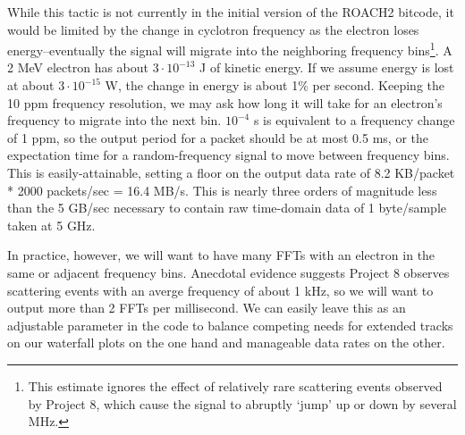 \documentclass[a4paper,10pt]{article}
\begin{document}
While this tactic is not currently in the initial version of the ROACH2 bitcode, it would be limited by the change in cyclotron frequency as the electron loses energy--eventually the signal will migrate into the neighboring frequency bins\footnote{This estimate ignores the effect of relatively rare scattering events observed by Project 8, which cause the signal to abruptly `jump' up or down by several MHz.}. A 2 MeV electron has about $3\cdot10^{-13}$ J of kinetic energy. If we assume energy is lost at about $3\cdot10^{-15}$ W, the change in energy is about 1\% per second. Keeping the 10 ppm frequency resolution, we may ask how long it will take for an electron's frequency to migrate into the next bin. $10^{-4}$ s is equivalent to a frequency change of 1 ppm, so the output period for a packet should be at most 0.5 ms, or the expectation time for a random-frequency signal to move between frequency bins. This is easily-attainable, setting a floor on the output data rate of 8.2 KB/packet * 2000 packets/sec = 16.4 MB/s. This is nearly three orders of magnitude less than the 5 GB/sec necessary to contain raw time-domain data of 1 byte/sample taken at 5 GHz. 

In practice, however, we will want to have many FFTs with an electron in the same or adjacent frequency bins. Anecdotal evidence suggests Project 8 observes scattering events with an averge frequency of about 1 kHz, so we will want to output more than 2 FFTs per millisecond. We can easily leave this as an adjustable parameter in the code to balance competing needs for extended tracks on our waterfall plots on the one hand and manageable data rates on the other. 
\end{document}
